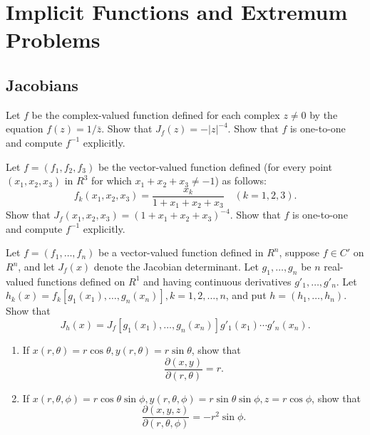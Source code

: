 \chapter{Implicit Functions and Extremum Problems}

\section{Jacobians}
\begin{problembox}
Let \( f \) be the complex-valued function defined for each complex \( z \neq 0 \) by the equation \( f(z) = 1/\bar{z} \). Show that \( J_f(z) = -|z|^{-4} \). Show that \( f \) is one-to-one and compute \( f^{-1} \) explicitly.
\end{problembox}

\begin{problembox}
Let \( f = (f_1, f_2, f_3) \) be the vector-valued function defined (for every point \( (x_1, x_2, x_3) \) in \( R^3 \) for which \( x_1 + x_2 + x_3 \neq -1 \)) as follows:
\[f_k(x_1, x_2, x_3) = \frac{x_k}{1 + x_1 + x_2 + x_3} \quad (k = 1, 2, 3).\]
Show that \( J_f(x_1, x_2, x_3) = (1 + x_1 + x_2 + x_3)^{-4} \). Show that \( f \) is one-to-one and compute \( f^{-1} \) explicitly.
\end{problembox}

\begin{problembox}
Let \( f = (f_1, \ldots, f_n) \) be a vector-valued function defined in \( R^n \), suppose \( f \in C' \) on \( R^n \), and let \( J_f(x) \) denote the Jacobian determinant. Let \( g_1, \ldots, g_n \) be \( n \) real-valued functions defined on \( R^1 \) and having continuous derivatives \( g'_1, \ldots, g'_n \). Let \( h_k(x) = f_k[g_1(x_1), \ldots, g_n(x_n)], k = 1, 2, \ldots, n \), and put \( h = (h_1, \ldots, h_n) \). Show that
\[J_h(x) = J_f[g_1(x_1), \ldots, g_n(x_n)]g'_1(x_1) \cdots g'_n(x_n).\]
\end{problembox}

\begin{problembox}
\begin{enumerate}[label=(\alph*)]
    \item If \( x(r, \theta) = r \cos \theta, y(r, \theta) = r \sin \theta \), show that
    \[\frac{\partial (x, y)}{\partial (r, \theta)} = r.\]
    \item If \( x(r, \theta, \phi) = r \cos \theta \sin \phi, y(r, \theta, \phi) = r \sin \theta \sin \phi, z = r \cos \phi \), show that
    \[\frac{\partial (x, y, z)}{\partial (r, \theta, \phi)} = -r^2 \sin \phi.\]
\end{enumerate}
\end{problembox}

